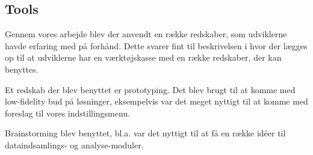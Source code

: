 \subsection{Tools}
Gennem vores arbejde blev der anvendt en række redskaber, som udviklerne havde erfaring med på forhånd.
Dette svarer fint til beskrivelsen i \citet[Kapitel 7]{} hvor der lægges op til at udviklerne har en værktøjskasse med en række redskaber, der kan benyttes.

Et redskab der blev benyttet er prototyping.
Det blev brugt til at komme med low-fidelity bud på løsninger, eksempelvis var det meget nyttigt til at komme med foreslag til vores indstillingsmenu.

Brainstorming blev benyttet, bl.a. var det nyttigt til at få en række idéer til dataindsamlings- og analyse-moduler.
